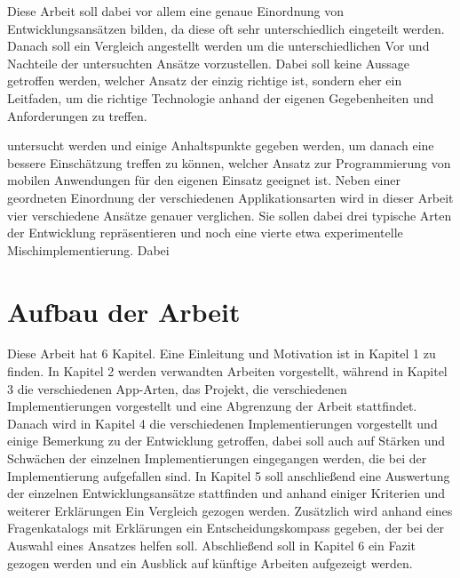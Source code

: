 Diese Arbeit soll dabei vor allem eine genaue Einordnung von Entwicklungsansätzen bilden, da diese oft sehr unterschiedlich eingeteilt werden. Danach soll ein Vergleich angestellt werden um die unterschiedlichen Vor und Nachteile der untersuchten Ansätze vorzustellen. Dabei soll keine Aussage getroffen werden, welcher Ansatz der einzig richtige ist, sondern eher ein Leitfaden, um die richtige Technologie anhand der eigenen Gegebenheiten und Anforderungen zu treffen.

untersucht werden und einige Anhaltspunkte gegeben werden, um danach eine bessere Einschätzung treffen zu können, welcher Ansatz zur Programmierung von mobilen Anwendungen für den eigenen Einsatz geeignet ist. 
Neben einer geordneten Einordnung der verschiedenen Applikationsarten wird in dieser Arbeit vier verschiedene Ansätze genauer verglichen. Sie sollen dabei drei typische Arten der Entwicklung repräsentieren und noch eine vierte etwa experimentelle Mischimplementierung.
Dabei 


\section{Aufbau der Arbeit}
Diese Arbeit hat 6 Kapitel. Eine Einleitung und Motivation ist in Kapitel 1 zu finden. In Kapitel 2 werden verwandten Arbeiten vorgestellt, während in Kapitel 3 die verschiedenen App-Arten, das Projekt, die verschiedenen Implementierungen vorgestellt und eine Abgrenzung der Arbeit stattfindet.
Danach wird in Kapitel 4 die verschiedenen Implementierungen vorgestellt und einige Bemerkung zu der Entwicklung getroffen, dabei soll auch auf Stärken und Schwächen der einzelnen Implementierungen eingegangen werden, die bei der Implementierung aufgefallen sind.
In Kapitel 5 soll anschließend eine Auswertung der einzelnen Entwicklungsansätze stattfinden und anhand einiger Kriterien und weiterer Erklärungen Ein Vergleich gezogen werden. Zusätzlich wird anhand eines Fragenkatalogs mit Erklärungen ein Entscheidungskompass gegeben, der bei der Auswahl eines Ansatzes helfen soll.  Abschließend soll in Kapitel 6 ein Fazit gezogen werden und ein Ausblick auf künftige Arbeiten aufgezeigt werden.